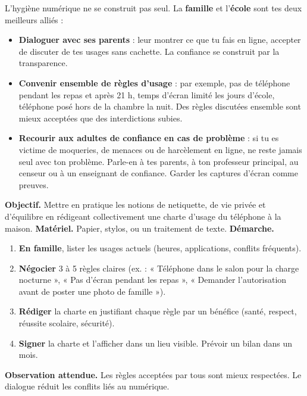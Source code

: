 \documentclass[11pt]{article}
\newcounter{popsec}
\newcounter{popsub}
\newcommand{\courssub}[1]{%
  \stepcounter{popsub}%
  \par\vspace{9pt}\noindent{\popxbold\fontsize{11.5}{13}\selectfont\color{popink}{\color{poporange}\thepopsec.\thepopsub}\hspace{6pt}#1}\par\nopagebreak\vspace{4pt}
}
\begin{document}
\courssub{Le rôle de la famille et de l'école}

L'hygiène numérique ne se construit pas seul. La \textbf{famille} et l'\textbf{école} sont tes deux meilleurs alliés :

\begin{itemize}
\item \textbf{Dialoguer avec ses parents} : leur montrer ce que tu fais en ligne, accepter de discuter de tes usages sans cachette. La confiance se construit par la transparence.
\item \textbf{Convenir ensemble de règles d'usage} : par exemple, pas de téléphone pendant les repas et après 21 h, temps d'écran limité les jours d'école, téléphone posé hors de la chambre la nuit. Des règles discutées ensemble sont mieux acceptées que des interdictions subies.
\item \textbf{Recourir aux adultes de confiance en cas de problème} : si tu es victime de moqueries, de menaces ou de harcèlement en ligne, ne reste jamais seul avec ton problème. Parle-en à tes parents, à ton professeur principal, au censeur ou à un enseignant de confiance. Garder les captures d'écran comme preuves.
\end{itemize}

\begin{experience}
\textbf{Objectif.} Mettre en pratique les notions de netiquette, de vie privée et d'équilibre en rédigeant collectivement une charte d'usage du téléphone à la maison.
\textbf{Matériel.} Papier, stylos, ou un traitement de texte.
\textbf{Démarche.}
\begin{enumerate}
\item \textbf{En famille}, lister les usages actuels (heures, applications, conflits fréquents).
\item \textbf{Négocier} 3 à 5 règles claires (ex. : « Téléphone dans le salon pour la charge nocturne », « Pas d'écran pendant les repas », « Demander l'autorisation avant de poster une photo de famille »).
\item \textbf{Rédiger} la charte en justifiant chaque règle par un bénéfice (santé, respect, réussite scolaire, sécurité).
\item \textbf{Signer} la charte et l'afficher dans un lieu visible. Prévoir un bilan dans un mois.
\end{enumerate}
\textbf{Observation attendue.} Les règles acceptées par tous sont mieux respectées. Le dialogue réduit les conflits liés au numérique.
\end{experience}
\end{document}
